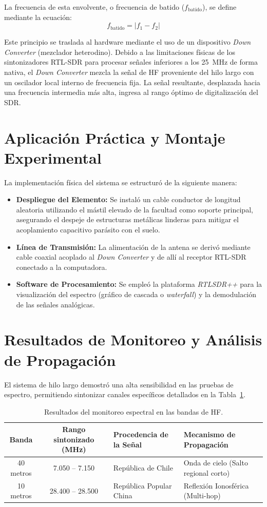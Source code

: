 \documentclass[runningheads]{llncs}
\begin{document}
La frecuencia de esta envolvente, o frecuencia de batido ($f_{\text{batido}}$), se define mediante la ecuación:
\begin{equation}
f_{\text{batido}} = |f_1 - f_2|
\end{equation}

Este principio se traslada al hardware mediante el uso de un dispositivo \textit{Down Converter} (mezclador heterodino). Debido a las limitaciones físicas de los sintonizadores RTL-SDR para procesar señales inferiores a los 25~MHz de forma nativa, el \textit{Down Converter} mezcla la señal de HF proveniente del hilo largo con un oscilador local interno de frecuencia fija. La señal resultante, desplazada hacia una frecuencia intermedia más alta, ingresa al rango óptimo de digitalización del SDR.

\section{Aplicación Práctica y Montaje Experimental}
La implementación física del sistema se estructuró de la siguiente manera:
\begin{itemize}
    \item \textbf{Despliegue del Elemento:} Se instaló un cable conductor de longitud aleatoria utilizando el mástil elevado de la facultad como soporte principal, asegurando el despeje de estructuras metálicas linderas para mitigar el acoplamiento capacitivo parásito con el suelo.
    \item \textbf{Línea de Transmisión:} La alimentación de la antena se derivó mediante cable coaxial acoplado al \textit{Down Converter} y de allí al receptor RTL-SDR conectado a la computadora.
    \item \textbf{Software de Procesamiento:} Se empleó la plataforma \textit{RTLSDR++} para la visualización del espectro (gráfico de cascada o \textit{waterfall}) y la demodulación de las señales analógicas.
\end{itemize}

\section{Resultados de Monitoreo y Análisis de Propagación}
El sistema de hilo largo demostró una alta sensibilidad en las pruebas de espectro, permitiendo sintonizar canales específicos detallados en la Tabla~\ref{tab:monitoreo}.

\begin{table}[htbp]
\centering
\caption{Resultados del monitoreo espectral en las bandas de HF.}
\label{tab:monitoreo}
\begin{tabular}{ccll}
\toprule
\textbf{Banda} & \textbf{Rango sintonizado (MHz)} & \textbf{Procedencia de la Señal} & \textbf{Mecanismo de Propagación} \\ \midrule
40 metros & 7.050 -- 7.150 & República de Chile & Onda de cielo (Salto regional corto) \\
10 metros & 28.400 -- 28.500 & República Popular China & Reflexión Ionosférica (Multi-hop) \\ \bottomrule
\end{tabular}
\end{table}
\end{document}
